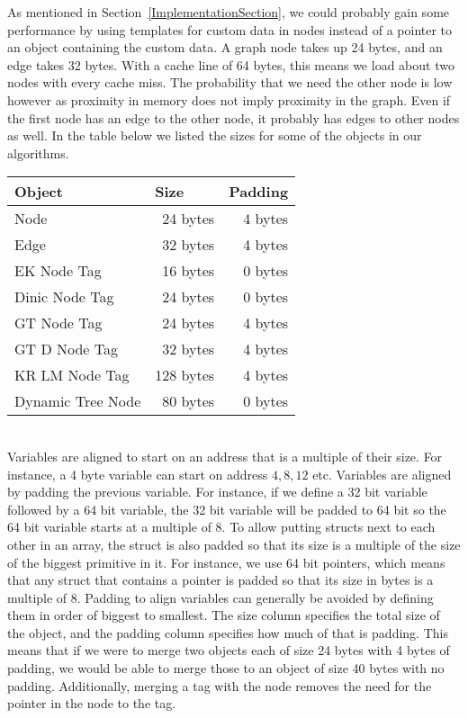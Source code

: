 As mentioned in Section~\ref{ImplementationSection}, we could probably gain some performance by using templates for custom data in nodes instead of a pointer to an object containing the custom data.
A graph node takes up 24 bytes, and an edge takes 32 bytes. With a cache line of 64 bytes, this means we load about two nodes with every cache miss.
The probability that we need the other node is low however as proximity in memory does not imply proximity in the graph.
Even if the first node has an edge to the other node, it probably has edges to other nodes as well.
In the table below we listed the sizes for some of the objects in our algorithms.
\begin{table}[h]
\centering
\begin{tabular}{|l|r|r|}
\hline
\multicolumn{1}{|l}{Object} &
\multicolumn{1}{|l}{Size} &
\multicolumn{1}{|l|}{Padding} \\\hline
Node&24 bytes & 4 bytes\\\hline
Edge&32 bytes & 4 bytes\\\hline
EK Node Tag & 16 bytes & 0 bytes\\\hline
Dinic Node Tag & 24 bytes & 0 bytes\\\hline
GT Node Tag & 24 bytes & 4 bytes\\\hline
GT D Node Tag & 32 bytes & 4 bytes\\\hline
KR LM Node Tag & 128 bytes & 4 bytes\\\hline
Dynamic Tree Node & 80 bytes & 0 bytes\\\hline
\end{tabular}
\end{table}\\
Variables are aligned to start on an address that is a multiple of their size. For instance, a 4 byte variable can start on address $4, 8, 12$ etc.
Variables are aligned by padding the previous variable. For instance, if we define a 32 bit variable followed by a 64 bit variable, 
the 32 bit variable will be padded to 64 bit so the 64 bit variable starts at a multiple of 8.
To allow putting structs next to each other in an array, the struct is also padded so that its size is a multiple of the size of the biggest primitive in it.
For instance, we use 64 bit pointers, which means that any struct that contains a pointer is padded so that its size in bytes is a multiple of 8.
Padding to align variables can generally be avoided by defining them in order of biggest to smallest.
The size column specifies the total size of the object, and the padding column specifies how much of that is padding. 
This means that if we were to merge two objects each of size 24 bytes with 4 bytes of padding, we would be able to merge those to an object of size 40 bytes with no padding.
Additionally, merging a tag with the node removes the need for the pointer in the node to the tag.

